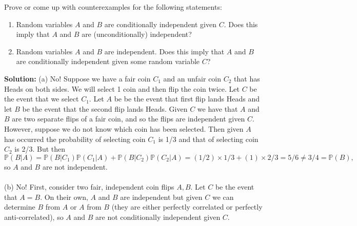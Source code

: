 \documentclass{harvardml}
\theoremstyle{definition}
\theoremstyle{plain}
\begin{document}
		    
\begin{problem}
Prove or come up with counterexamples for the following statements:
    \begin{enumerate}[label=(\alph*)]
        \item  Random variables $A$ and $B$ are conditionally independent given $C$.  Does this imply that $A$ and $B$ are (unconditionally) independent?
        \item  Random variables $A$ and $B$ are independent.  Does this imply that $A$ and $B$ are conditionally independent given some random variable $C$?
    \end{enumerate}

\noindent \textbf{Solution:} 
(a) No! Suppose we have a fair coin $C_1$ and an unfair coin $C_2$ that has Heads on both sides. We will select 1 coin and then flip the coin twice. Let $C$ be the event that we select $C_1$. Let $A$ be be the event that first flip lands Heads and let $B$ be the event that the second flip lands Heads. Given $C$ we have that $A$ and $B$ are two separate flips of a fair coin, and so the flips are independent given $C$. However, suppose we do not know which coin has been selected. Then given $A$ has occurred the probability of selecting coin $C_1$ is 1/3 and that of selecting coin $C_2$ is 2/3. But then $\mathbb P(B|A) = \mathbb P(B|C_1)\mathbb P(C_1|A) + \mathbb P(B|C_2)\mathbb P(C_2|A) = (1/2)\times 1/3 + (1)\times 2/3 = 5/6 \neq 3/4 = \mathbb P(B),$ so $A$ and $B$ are not independent.
\\
\\
(b) No! First, consider two fair, independent coin flips $A, B$. Let $C$ be the event that $A=B$. On their own, $A$ and $B$ are independent but given $C$ we can determine $B$ from $A$ or $A$ from $B$ (they are either perfectly correlated or perfectly anti-correlated), so $A$ and $B$ are not conditionally independent given $C$.
\end{problem}
		   
\end{document}
